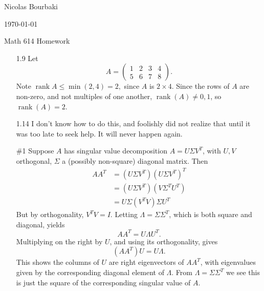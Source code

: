 \documentclass[12pt]{report}
\newcommand{\rank}{\operatorname{rank}} %
\begin{document}
\hfill Nicolas Bourbaki %

\hfill \today 

\centerline{\large{Math 614 Homework}}

\begin{enumerate}

 \item[1.9] %
Let 
$$A=\begin{pmatrix}1&2&3&4\\5&6&7&8\end{pmatrix}.$$
Note $\rank{A}\le \min(2,4)=2,$ since $A$ is $2\times 4$.
Since the rows of $A$ are non-zero, and not multiples of one another, $\rank(A)\ne 0,1$, so $\rank(A)=2$.

\item[1.14] %
I don't know how to do this, and foolishly did not realize that until it was too late to seek help. It will never happen again.


\item[\#1] %
Suppose $A$ has singular value decomposition $A=U\Sigma V^T$, with $U,V$ orthogonal, $\Sigma$ a (possibly non-square) diagonal matrix.
Then
\begin{align*}
AA^T&=(U\Sigma V^T)(U\Sigma V^T)^T\\
&= (U\Sigma V^T)(V\Sigma^T U^T)\\
&= U\Sigma (V^TV) \Sigma U^T
\end{align*}
But by orthogonality, $V^TV=I$. Letting $\Lambda=\Sigma\Sigma^T$, which is both square and diagonal, yields 
$$AA^T=U\Lambda U^T.$$
Multiplying on the right by $U$, and using its orthogonality, gives
 $$(AA^T) U= U\Lambda.$$
 This shows the columns of $U$ are right eigenvectors of $A A^T$, with eigenvalues given by the corresponding diagonal element of $\Lambda$. From
 $\Lambda=\Sigma\Sigma^T$ we see this is just the square of the corresponding singular value of $A$.



\end{enumerate}
\end{document}
